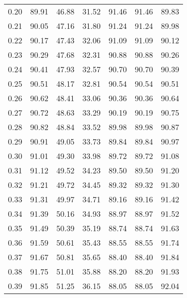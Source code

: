 \begin{tabular}{|c|c|c|c|c|c|c|}
      0.20 &     89.91 &     46.88 &      31.52 &   91.46 &      91.46 &         89.83 \\
      0.21 &     90.05 &     47.16 &      31.80 &   91.24 &      91.24 &         89.98 \\
      0.22 &     90.17 &     47.43 &      32.06 &   91.09 &      91.09 &         90.12 \\
      0.23 &     90.29 &     47.68 &      32.31 &   90.88 &      90.88 &         90.26 \\
      0.24 &     90.41 &     47.93 &      32.57 &   90.70 &      90.70 &         90.39 \\
      0.25 &     90.51 &     48.17 &      32.81 &   90.54 &      90.54 &         90.51 \\
      0.26 &     90.62 &     48.41 &      33.06 &   90.36 &      90.36 &         90.64 \\
      0.27 &     90.72 &     48.63 &      33.29 &   90.19 &      90.19 &         90.75 \\
      0.28 &     90.82 &     48.84 &      33.52 &   89.98 &      89.98 &         90.87 \\
      0.29 &     90.91 &     49.05 &      33.73 &   89.84 &      89.84 &         90.97 \\
      0.30 &     91.01 &     49.30 &      33.98 &   89.72 &      89.72 &         91.08 \\
      0.31 &     91.12 &     49.52 &      34.23 &   89.50 &      89.50 &         91.20 \\
      0.32 &     91.21 &     49.72 &      34.45 &   89.32 &      89.32 &         91.30 \\
      0.33 &     91.31 &     49.97 &      34.71 &   89.16 &      89.16 &         91.42 \\
      0.34 &     91.39 &     50.16 &      34.93 &   88.97 &      88.97 &         91.52 \\
      0.35 &     91.49 &     50.39 &      35.19 &   88.74 &      88.74 &         91.63 \\
      0.36 &     91.59 &     50.61 &      35.43 &   88.55 &      88.55 &         91.74 \\
      0.37 &     91.67 &     50.81 &      35.65 &   88.40 &      88.40 &         91.84 \\
      0.38 &     91.75 &     51.01 &      35.88 &   88.20 &      88.20 &         91.93 \\
      0.39 &     91.85 &     51.25 &      36.15 &   88.05 &      88.05 &         92.04 \\

\end{tabular}
